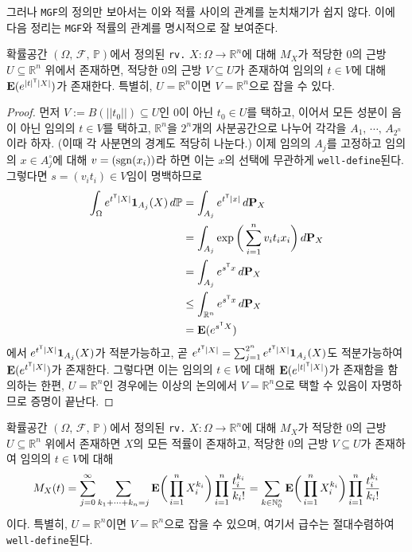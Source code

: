 그러나 \texttt{MGF}의 정의만 보아서는 이와 적률 사이의 관계를 눈치채기가 쉽지 않다. 이에 다음 정리는 \texttt{MGF}와 적률의 관계를 명시적으로 잘 보여준다.

\begin{lemma}
    확률공간 $(\Omega,\,\mathcal{F},\,\mathbb{P})$에서 정의된 \texttt{rv.} $X:\Omega\to\mathbb{R}^n$에 대해 $M_X$가 적당한 $0$의 근방 $U\subseteq\mathbb{R}^n$ 위에서 존재하면, 적당한 $0$의 근방 $V\subseteq U$가 존재하여 임의의 $t\in V$에 대해 $\mathbf{E}(e^{|t|^{\mathsf{T}}|X|})$가 존재한다. 특별히, $U=\mathbb{R}^n$이면 $V=\mathbb{R}^n$으로 잡을 수 있다.
\end{lemma}

\begin{proof}
    먼저 $V:=B(||t_0||)\subseteq U$인 $0$이 아닌 $t_0\in U$를 택하고, 이어서 모든 성분이 음이 아닌 임의의 $t\in V$를 택하고, $\mathbb{R}^n$을 $2^n$개의 사분공간으로 나누어 각각을 $A_1,\,\cdots,\,A_{2^n}$이라 하자. (이때 각 사분면의 경계도 적당히 나눈다.) 이제 임의의 $A_j$를 고정하고 임의의 $x\in A_j^\circ$에 대해 $v=(\mathrm{sgn}(x_i))$라 하면 이는 $x$의 선택에 무관하게 \texttt{well-define}된다. 그렇다면 $s=(v_it_i)\in V$임이 명백하므로
    \begin{align*}
        \int_\Omega e^{t^{\mathsf{T}}|X|}\mathbf{1}_{A_j}(X)\,d\mathbb{P}&=\int_{A_j}e^{t^{\mathsf{T}}|x|}\,d\mathbf{P}_X\\
        &=\int_{A_j}\exp\bigg(\sum_{i=1}^nv_it_ix_i\bigg)\,d\mathbf{P}_X\\
        &=\int_{A_j}e^{s^{\mathsf{T}} x}\,d\mathbf{P}_X\\
        &\leq\int_{\mathbb{R}^n}e^{s^{\mathsf{T}} x}\,d\mathbf{P}_X\\
        &=\mathbf{E}(e^{s^{\mathsf{T}} X})
    \end{align*}
    에서 $e^{t^{\mathsf{T}}|X|}\mathbf{1}_{A_j}(X)$가 적분가능하고, 곧 $e^{t^{\mathsf{T}}|X|}=\sum_{j=1}^{2^n}e^{t^{\mathsf{T}}|X|}\mathbf{1}_{A_j}(X)$도 적분가능하여 $\mathbf{E}(e^{t^{\mathsf{T}}|X|})$가 존재한다. 그렇다면 이는 임의의 $t\in V$에 대해 $\mathbf{E}(e^{|t|^{\mathsf{T}}|X|})$가 존재함을 함의하는 한편, $U=\mathbb{R}^n$인 경우에는 이상의 논의에서 $V=\mathbb{R}^n$으로 택할 수 있음이 자명하므로 증명이 끝난다.
\end{proof}

\begin{theorem}\label{thm:MGFTaylor}
    확률공간 $(\Omega,\,\mathcal{F},\,\mathbb{P})$에서 정의된 \texttt{rv.} $X:\Omega\to\mathbb{R}^n$에 대해 $M_X$가 적당한 $0$의 근방 $U\subseteq\mathbb{R}^n$ 위에서 존재하면 $X$의 모든 적률이 존재하고, 적당한 $0$의 근방 $V\subseteq U$가 존재하여 임의의 $t\in V$에 대해 
    \begin{equation*}
        M_X(t)=\sum_{j=0}^\infty\sum_{k_1+\cdots+k_n=j}\mathbf{E}\bigg(\prod_{i=1}^nX_i^{k_i}\bigg)\prod_{i=1}^n\frac{t_i^{k_i}}{k_i!}=\sum_{k\in\mathbb{N}_0^n}\mathbf{E}\bigg(\prod_{i=1}^nX_i^{k_i}\bigg)\prod_{i=1}^n\frac{t_i^{k_i}}{k_i!}
    \end{equation*}
    이다. 특별히, $U=\mathbb{R}^n$이면 $V=\mathbb{R}^n$으로 잡을 수 있으며, 여기서 급수는 절대수렴하여 \texttt{well-define}된다.
\end{theorem}

